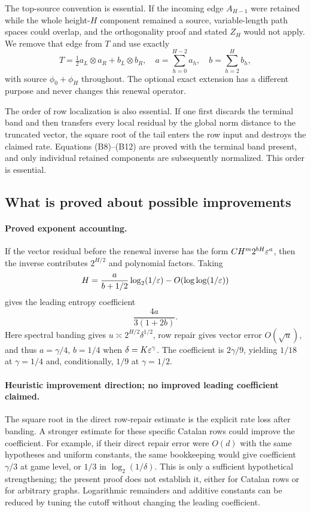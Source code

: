 The top-source convention is essential. If the incoming edge $A_{H-1}$ were retained while the whole height-$H$ component remained a source, variable-length path spaces could overlap, and the orthogonality proof and stated $Z_H$ would not apply. We remove that edge from $T$ and use exactly
\[
 T=\tfrac12a_L\otimes a_R+b_L\otimes b_R,\quad
 a=\sum_{h=0}^{H-2}a_h,\quad b=\sum_{h=2}^{H}b_h,
\]
with source $\phi_0+\phi_H$ throughout. The optional exact extension has a different purpose and never changes this renewal operator.

The order of row localization is also essential. If one first discards the terminal band and then transfers every local residual by the global norm distance to the truncated vector, the square root of the tail enters the row input and destroys the claimed rate. Equations (B8)--(B12) are proved with the terminal band present, and only individual retained components are subsequently normalized. This order is essential.

\subsection{What is proved about possible improvements}\label{rnd:sec:limits}
\paragraph{Proved exponent accounting.}
If the vector residual before the renewal inverse has the form
$C H^m2^{bH}\varepsilon^a$, then the inverse contributes $2^{H/2}$ and polynomial factors. Taking
\[
 H=\frac{a}{b+1/2}\log_2(1/\varepsilon)-O(\log\log(1/\varepsilon))
\]
gives the leading entropy coefficient
\[
 \frac{4a}{3(1+2b)}.
\]
Here spectral banding gives $u\asymp2^{H/2}\delta^{1/2}$, row repair gives vector error $O(\sqrt u)$, and thus $a=\gamma/4$, $b=1/4$ when $\delta=K\varepsilon^\gamma$. The coefficient is $2\gamma/9$, yielding $1/18$ at $\gamma=1/4$ and, conditionally, $1/9$ at $\gamma=1/2$.

\paragraph{Heuristic improvement direction; no improved leading coefficient claimed.}
The square root in the direct row-repair estimate is the explicit rate loss after banding. A stronger estimate for these specific Catalan rows could improve the coefficient. For example, if their direct repair error were $O(d)$ with the same hypotheses and uniform constants, the same bookkeeping would give coefficient $\gamma/3$ at game level, or $1/3$ in $\log_2(1/\delta)$. This is only a sufficient hypothetical strengthening; the present proof does not establish it, either for Catalan rows or for arbitrary graphs. Logarithmic remainders and additive constants can be reduced by tuning the cutoff without changing the leading coefficient.


